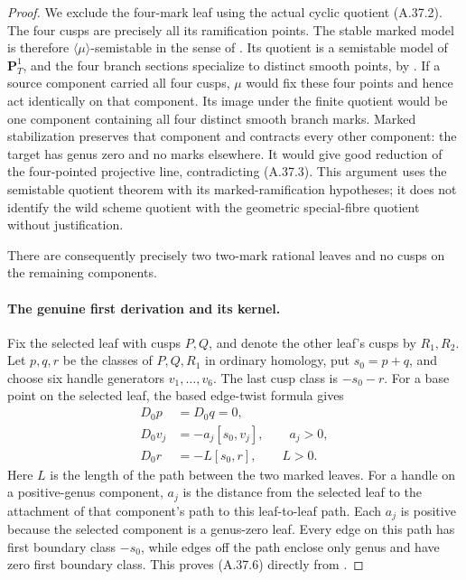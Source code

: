 \begin{proof}
We exclude the four-mark leaf using the actual cyclic
quotient (A.37.2). The four cusps are precisely all its
ramification points. The stable marked model is therefore
\(\langle\mu\rangle\)-semistable in the sense of
\cite[Definition 3.1(c)]{fghBouwWewers}.
Its quotient is a semistable model of
\(\mathbf P^1_T\), and the four branch sections specialize
to distinct smooth points, by
\cite[Lemma 3.2(i)--(ii)]{fghBouwWewers}.
If a source component carried all four cusps, \(\mu\)
would fix these four points and hence act identically
on that component. Its image under the finite quotient
would be one component containing all four distinct
smooth branch marks. Marked stabilization preserves
that component and contracts every other component:
the target has genus zero and no marks elsewhere.
It would give good reduction of the four-pointed
projective line, contradicting (A.37.3).
This argument uses the semistable quotient theorem
with its marked-ramification hypotheses; it does not
identify the wild scheme quotient with the geometric
special-fibre quotient without justification.

There are consequently precisely two two-mark rational
leaves and no cusps on the remaining components.

\paragraph{The genuine first derivation and its kernel.}
Fix the selected leaf with cusps \(P,Q\), and denote
the other leaf's cusps by \(R_1,R_2\). Let
\(p,q,r\) be the classes of \(P,Q,R_1\) in ordinary
homology, put \(s_0=p+q\), and choose six handle
generators \(v_1,\ldots,v_6\). The last cusp class
is \(-s_0-r\). For a base point on the selected leaf,
the based edge-twist formula gives
\[
 \begin{split}
 D_0p&=D_0q=0,\\
 D_0v_j&=-a_j[s_0,v_j],\qquad a_j>0,\\
 D_0r&=-L[s_0,r],\qquad L>0.
 \end{split}
                                                        \tag{A.37.6}
\]
Here \(L\) is the length of the path between the two
marked leaves. For a handle on a positive-genus
component, \(a_j\) is the distance from the selected
leaf to the attachment of that component's path to
this leaf-to-leaf path. Each \(a_j\) is positive
because the selected component is a genus-zero leaf.
Every edge on this path has first boundary class
\(-s_0\), while edges off the path enclose only
genus and have zero first boundary class. This proves
(A.37.6) directly from
\cite[Definition 3.1.5 and Theorem 3.1.6]{fghBettsDogra}.


\end{proof}
